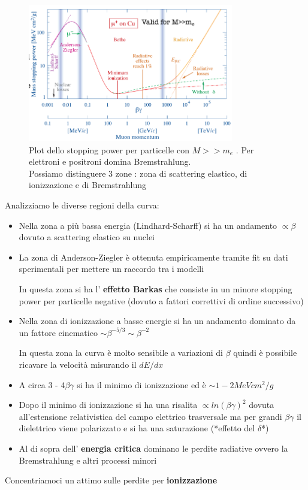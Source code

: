         \begin{figure}[H]
            \centering
            \includegraphics[width=0.8\textwidth,frame]{Chapters/images/Interazione_radiazione_materia/image-20220214171429817.png}
            \caption{Plot dello stopping power per particelle con $M>>m_e$ . Per elettroni e positroni domina Bremstrahlung.\\Possiamo distinguere 3 zone : zona di scattering elastico, di ionizzazione e di Bremstrahlung}
            \label{fig:betheblock}
        \end{figure}
    Analizziamo le diverse regioni della curva:
    \begin{itemize}
        \item Nella zona a più bassa energia (Lindhard-Scharff) si ha un andamento $\propto \beta$ dovuto a scattering elastico su nuclei

        \item La zona di Anderson-Ziegler è ottenuta empiricamente tramite fit su dati sperimentali per mettere un raccordo tra i modelli

        In questa zona si ha l' \textbf{effetto Barkas} che consiste in un minore stopping power per particelle negative (dovuto a fattori correttivi di ordine successivo)

        \item Nella zona di ionizzazione a basse energie si ha un andamento dominato da un fattore cinematico $\sim \beta^{-5/3} \sim \beta^{-2}$ 

        In questa zona la curva è molto sensibile a variazioni di $\beta$ quindi è possibile ricavare la velocità misurando il $dE/dx$

        \item A circa 3 - 4$\beta \gamma$ si ha il minimo di ionizzazione ed è $\sim 1-2 MeV cm^2/g$

        \item Dopo il minimo di ionizzazione si ha una risalita $\propto ln(\beta \gamma)^2$ dovuta all'estensione relativistica del campo elettrico trasversale ma per grandi $\beta \gamma$ il dielettrico viene polarizzato e si ha una saturazione (*effetto del $\delta$*)

        \item Al di sopra dell' \textbf{energia critica} dominano le perdite radiative ovvero la Bremstrahlung e altri processi minori
    \end{itemize}
Concentriamoci un attimo sulle perdite per \textbf{ionizzazione}

